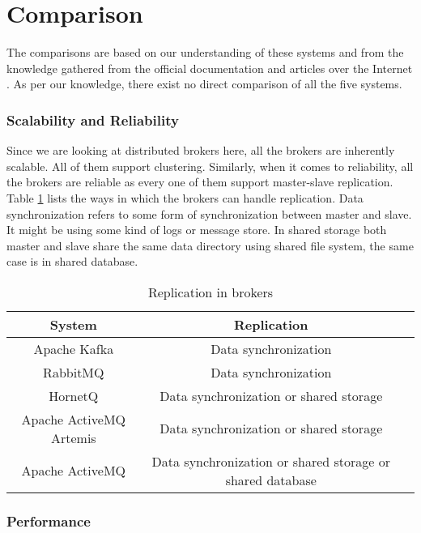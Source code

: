 \section{Comparison}

The comparisons are based on our understanding of these systems and from the knowledge gathered from the official documentation and articles over the Internet \parencite{broker_compr} \parencite{eriksson2016comparing} \parencite{broker_performance} \parencite{broker_explore} \parencite{broker_mq}. As per our knowledge, there exist no direct comparison of all the five systems.

\subsubsection{Scalability and Reliability}

Since we are looking at distributed brokers here, all the brokers are inherently scalable. All of them support clustering. Similarly, when it comes to reliability, all the brokers are reliable as every one of them support master-slave replication. Table \ref{table:comparison} lists the ways in which the brokers can handle replication. Data synchronization refers to some form of synchronization between master and slave. It might be using some kind of logs or message store. In shared storage both master and slave share the same data directory using shared file system, the same case is in shared database.

\begin{table}[h]
  \centering
  \caption{Replication in brokers}
  \label{table:comparison}
  \begin{tabular}{ccc}
    \toprule
    System & Replication\\
    \midrule
    Apache Kafka & Data synchronization\\
    RabbitMQ & Data synchronization \\
    HornetQ & Data synchronization or shared storage \\
    Apache ActiveMQ Artemis & Data synchronization or shared storage\\
    Apache ActiveMQ & Data synchronization or shared storage or shared database\\
    \bottomrule
  \end{tabular}
\end{table} 

\subsubsection{Performance}

